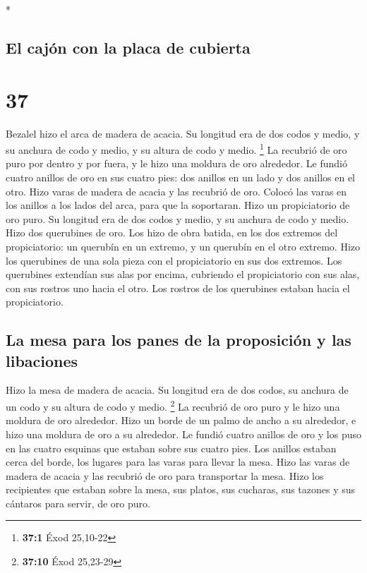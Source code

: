 \begin{paracol}{2}
\begin{otherlanguage}{english}
\end{otherlanguage}

\switchcolumn[0]*

\hypertarget{el-cajuxf3n-con-la-placa-de-cubierta}{%
\subsection{El cajón con la placa de
cubierta}\label{el-cajuxf3n-con-la-placa-de-cubierta}}

\hypertarget{section-72}{%
\section{37}\label{section-72}}

 Bezalel hizo el arca de madera de acacia. Su longitud era
de dos codos y medio, y su anchura de codo y medio, y su altura de codo
y medio. \footnote{\textbf{37:1} Éxod 25,10-22}  La
recubrió de oro puro por dentro y por fuera, y le hizo una moldura de
oro alrededor.  Le fundió cuatro anillos de oro en sus
cuatro pies: dos anillos en un lado y dos anillos en el otro.
 Hizo varas de madera de acacia y las recubrió de oro.
 Colocó las varas en los anillos a los lados del arca,
para que la soportaran.  Hizo un propiciatorio de oro
puro. Su longitud era de dos codos y medio, y su anchura de codo y
medio.  Hizo dos querubines de oro. Los hizo de obra
batida, en los dos extremos del propiciatorio:  un
querubín en un extremo, y un querubín en el otro extremo. Hizo los
querubines de una sola pieza con el propiciatorio en sus dos extremos.
 Los querubines extendían sus alas por encima, cubriendo
el propiciatorio con sus alas, con sus rostros uno hacia el otro. Los
rostros de los querubines estaban hacia el propiciatorio.

\hypertarget{la-mesa-para-los-panes-de-la-proposiciuxf3n-y-las-libaciones}{%
\subsection{La mesa para los panes de la proposición y las
libaciones}\label{la-mesa-para-los-panes-de-la-proposiciuxf3n-y-las-libaciones}}

 Hizo la mesa de madera de acacia. Su longitud era de dos
codos, su anchura de un codo y su altura de codo y medio. \footnote{\textbf{37:10}
  Éxod 25,23-29}  La recubrió de oro puro y le hizo una
moldura de oro alrededor.  Hizo un borde de un palmo de
ancho a su alrededor, e hizo una moldura de oro a su alrededor.
 Le fundió cuatro anillos de oro y los puso en las cuatro
esquinas que estaban sobre sus cuatro pies.  Los anillos
estaban cerca del borde, los lugares para las varas para llevar la mesa.
 Hizo las varas de madera de acacia y las recubrió de oro
para transportar la mesa.  Hizo los recipientes que
estaban sobre la mesa, sus platos, sus cucharas, sus tazones y sus
cántaros para servir, de oro puro.


\end{paracol}
